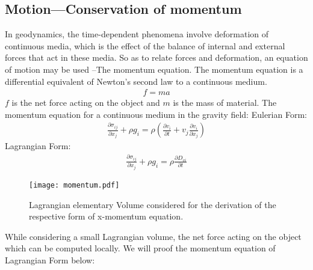 \subsection{Motion---Conservation of momentum}
In geodynamics, the time-dependent phenomena involve deformation of continuous media, which is the effect of the balance of internal and external forces that act in these media. So as to relate forces and deformation, an equation of motion may be used --The momentum equation. The momentum equation is a differential equivalent of Newton’s second law to a continuous medium.
\begin{align}
f=ma
\end{align}
$f$ is the net force acting on the object and $m$ is the mass of material. The momentum equation for a continuous medium in the gravity field:
Eulerian Form:  \begin{align}
\frac{\partial \sigma_{ij}}{\partial x_j}+\rho g_i = \rho (\frac{\partial v_i}{\partial t}+v_j\frac{\partial v_i}{\partial x_j})
\end{align}
Lagrangian Form:  \begin{align}
\frac{\partial \sigma_{ij}}{\partial x_j}+\rho g_i = \rho \frac{\partial D_{vi}}{\partial t}
\end{align}
\begin{figure*}[ht!]
    \centering
    \texttt{[image: momentum.pdf]}
    \caption{ Lagrangian elementary Volume considered for the derivation of the respective form of x-momentum equation.}
    \label{fig::Lagrangian Volume}
\end{figure*}

While considering a small Lagrangian volume, the net force acting on the object which can be computed locally. We will proof the momentum equation of Lagrangian Form below:

